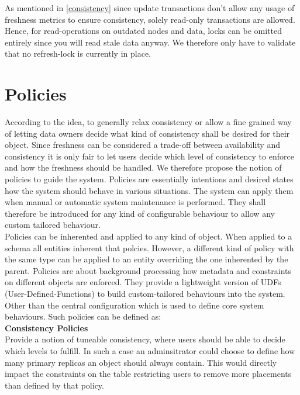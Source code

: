 As mentioned in \ref{consistency} since update transactions don't allow any usage of freshness metrics to ensure consistency, solely read-only transactions are allowed.
Hence, for read-operations on outdated nodes and data, locks can be omitted entirely since you will read stale data anyway.
We therefore only have to validate that no refresh-lock is currently in place.







\section{ Policies }

According to the idea, to generally relax consistency or allow a fine grained way of letting data owners decide what kind of consistency shall be desired for their object. 
Since freshness can be considered a trade-off between availability and consistency it is only fair to let users decide which level of consistency to enforce and 
how the freshness should be handled. We therefore propose the notion of policies to guide the system.
Policies are essentially intentions and desired states how the system should behave in various situations. 
The system can apply them when manual or automatic system maintenance is performed.
They shall therefore be introduced for any kind of configurable behaviour to allow any custom tailored behaviour. \\

Policies can be inherented and applied to any kind of object. When applied to a schema all entities inherent that polcies.
However, a different kind of policy with the same type can be applied to an entity overriding the one inherented by the parent.
Policies are about background processing how metadata and constraints on different objects are enforced. 
They provide a lightweight version of UDFs (User-Defined-Functions) to build custom-tailored behaviours into the system.
Other than the central configuration which is used to define core system behaviours. 
Such policies can be defined as:\\


\textbf{Consistency Policies}\\
Provide a notion of tuneable consistency, where users should be able to decide which levels to fulfill.
In such a case an adminsitrator could choose to define how many primary replicas an object should always contain.
This would directly impact the constraints on the table restricting users to remove more placements than defined by that policy.\\


